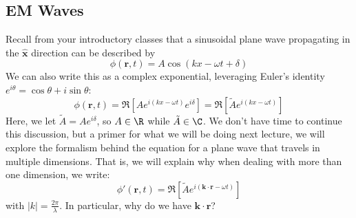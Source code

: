 \subsection{EM Waves} 
Recall from your introductory classes that a sinusoidal plane wave propagating in the \( \hat{\mathbf{x}} \) direction
can be described by 
\[
	\phi(\mathbf{r}, t) = A \cos(kx - \omega t + \delta)
\]
We can also write this as a complex exponential, leveraging Euler's identity \( e^{i \theta} = \cos \theta +
i \sin \theta\):
\[
	\phi(\mathbf{r}, t) = \Re\left[ Ae^{i(kx - \omega t)}e^{i \delta} \right] =
	\Re\left[\tilde A e^{i(kx - \omega t)}\right]
\]
Here, we let \( \tilde A = Ae^{i \delta} \), so \( A \in \R \) while \( \tilde A \in \C \). We don't have
time to continue this discussion, but a primer for what we will be doing next lecture, we will explore the
formalism behind the equation for a plane wave that travels in multiple dimensions. That is, we will explain
why when dealing with more than one dimension, we write:
\[
\phi'(\mathbf{r}, t) = \Re\left[\tilde A e^{i(\mathbf{k} \cdot \mathbf{r} - \omega t)}\right]
\]
with \( |k| = \frac{2\pi}{\lambda} \). In particular, why do we have \( \mathbf{k}\cdot \mathbf{r} \)?
 



